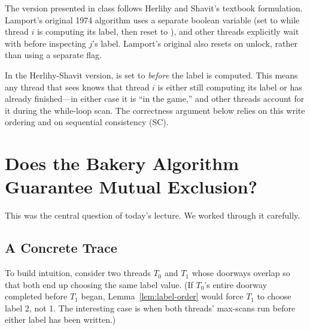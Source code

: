\begin{ppnote}
\par
The version presented in class follows Herlihy and Shavit's textbook
formulation. Lamport's original 1974 algorithm uses a separate
 boolean variable (set to  while thread
$i$ is computing its label, then reset to ), and other threads
explicitly wait with  before inspecting $j$'s
label. Lamport's original also resets  on unlock,
rather than using a separate flag.

In the Herlihy-Shavit version,  is set to 
\emph{before} the label is computed. This means any thread that sees
 knows that thread $i$ is either still computing its
label or has already finished---in either case it is ``in the game,'' and other
threads account for it during the while-loop scan. The correctness argument
below relies on this write ordering and on sequential consistency (SC).
\end{ppnote}

\section{Does the Bakery Algorithm Guarantee Mutual Exclusion?}

This was the central question of today's lecture. We worked through it carefully.

\subsection{A Concrete Trace}

To build intuition, consider two threads $T_0$ and $T_1$ whose doorways
overlap so that both end up choosing the same label value. (If $T_0$'s
entire doorway completed before $T_1$ began, Lemma~\ref{lem:label-order}
would force $T_1$ to choose label 2, not 1. The interesting case is when
both threads' max-scans run before either label has been written.)

